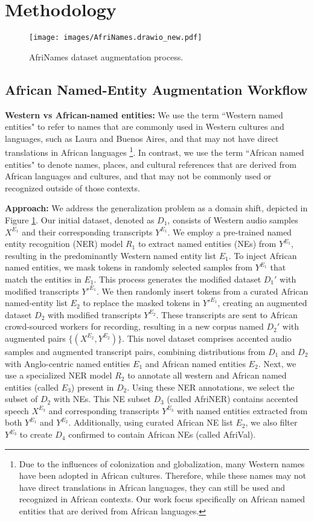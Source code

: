 \documentclass{INTERSPEECH2023}
\begin{document}
\section{Methodology}
\begin{figure}[h]
\texttt{[image: images/AfriNames.drawio\_new.pdf]} %
\centering
\caption{AfriNames dataset augmentation process.}
\label{fig:method}
\end{figure}

\subsection{African Named-Entity Augmentation Workflow}
\textbf{Western vs African-named entities:} We use the term ``Western named entities" to refer to names that are commonly used in Western cultures and languages, such as Laura and Buenos Aires, and that may not have direct translations in African languages \footnote{Due to the influences of colonization and globalization, many Western names have been adopted in African cultures. Therefore, while these names may not have direct translations in African languages, they can still be used and recognized in African contexts. Our work focus specifically on African named entities that are derived from African languages. }. In contrast, we use the term ``African named entities" to denote names, places, and cultural references that are derived from African languages and cultures, and that may not be commonly used or recognized outside of those contexts.

\textbf{Approach:} 
We address the generalization problem as a domain shift, depicted in Figure \ref{fig:method}. Our initial dataset, denoted as $D_1$, consists of Western audio samples $X^{E_{1}}$ and their corresponding transcripts $Y^{E_{1}}$. We employ a pre-trained named entity recognition (NER) model $R_1$ to extract named entities (NEs) from $Y^{E_{1}}$, resulting in the predominantly Western named entity list $E_1$. To inject African named entities, we mask tokens in randomly selected samples from $Y^{E_{1}}$ that match the entities in $E_1$. This process generates the modified dataset $D_1'$ with modified transcripts $Y'^{E_{1}}$. We then randomly insert tokens from a curated African named-entity list $E_2$ to replace the masked tokens in $Y'^{E_{1}}$, creating an augmented dataset $D_2$ with modified transcripts $Y^{E_{2}}$. These transcripts are sent to African crowd-sourced workers for recording, resulting in a new corpus named $D_2'$ with augmented pairs $\{(X^{E_{2}},Y^{E_{2}})\}$. This novel dataset comprises accented audio samples and augmented transcript pairs, combining distributions from $D_1$ and $D_2$ with Anglo-centric named entities $E_1$ and African named entities $E_2$. Next, we use a specialized NER model $R_2$ to annotate all western and African named entities (called $E_3$) present in $D_2$. Using these NER annotations, we select the subset of $D_2$ with NEs. This NE subset $D_3$ (called AfriNER) contains accented speech $X^{E_{3}}$ and corresponding transcripts $Y^{E_{3}}$ with named entities extracted from both $Y^{E_{1}}$ and $Y^{E_{2}}$. Additionally, using curated African NE list $E_2$, we also filter $Y^{E_{3}}$ to create $D_4$ confirmed to contain African NEs (called AfriVal).
\end{document}

